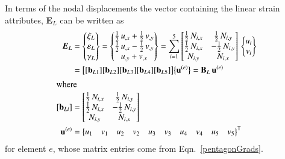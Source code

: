 In terms of the nodal displacements the vector containing the linear strain attributes, $\boldsymbol{E}_L$ can be written as
\begin{subequations}
\begin{align}
    \boldsymbol{E}_L & = \begin{Bmatrix}
    \xi_{L} \\
    \varepsilon_{L} \\
    \gamma_{L} \end{Bmatrix} = 
    \begin{Bmatrix}
    \tfrac{1}{2} \, u_{,x} + \tfrac{1}{2} \, v_{,y} \\
    \tfrac{1}{2} \, u_{,x} - \tfrac{1}{2} \, v_{,y} \\
    u_{,y} + v_{,x} \end{Bmatrix} = 
    \sum_{i=1}^5 \begin{bmatrix}
    \tfrac{1}{2} \, N_{i,x} & \tfrac{1}{2} \, N_{i,y}  \\
    \tfrac{1}{2} \, N_{i,x} & -\tfrac{1}{2} \, N_{i,y} \\ 
    N_{i,y} & N_{i,x}  \end{bmatrix} \, 
    \begin{Bmatrix}
    u_{i} \\
    v_{i} 
    \end{Bmatrix} \notag \\
    & = \bigl[ [\mathbf{b}_{L1}] [\mathbf{b}_{L2}] [\mathbf{b}_{L3}] 
    [\mathbf{b}_{L4}] [\mathbf{b}_{L5}] \bigr]
    \bigl\{ \mathbf{u}^{(e)} \bigr\}  
    = \mathbf{B}_L \, \mathbf{u}^{(e)}  \\
    \intertext{where}
    [\mathbf{b}_{Li}] & = \begin{bmatrix}
    \tfrac{1}{2} \, N_{i,x}  &  \tfrac{1}{2} \, N_{i,y} \\
    \tfrac{1}{2} \, N_{i,x}  & - \tfrac{1}{2} \, N_{i,y} \\
    N_{i,y} & N_{i,x} 
    \end{bmatrix} \\
    \mathbf{u}^{(e)} & = \bigl\{ \begin{matrix}
    u_1 & v_1 & u_2 & v_2 & u_3 & v_3 & u_4 & v_4 & u_5 & v_5 
    \end{matrix} \bigr\}^{\mathsf{T}}
\end{align}
\end{subequations}
for element $e$, whose matrix entries come from Eqn.~\eqref{pentagonGrads}.

